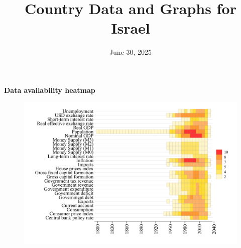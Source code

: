 \documentclass[12pt,a4paper,landscape]{article}
\begin{document}
\title{\Large Country Data and Graphs for Israel}
\date{June 30, 2025}
\maketitle
\thispagestyle{empty}

\clearpage
\setcounter{page}{1}
\hypersetup{colorlinks=true,linkcolor=blue,linktoc=all}
\label{toc}
\tableofcontents
\thispagestyle{empty}
\clearpage
{}
{}
\begin{center}
{\Large\bfseries Data availability heatmap}
\end{center}
\vspace{1cm}
\begin{figure}[H]
\centering
\includegraphics[width=\textwidth,height=0.8\textheight,keepaspectratio]{graphs/ISR_heatmap.pdf}
\end{figure}
\setcounter{page}{3}
\end{document}
